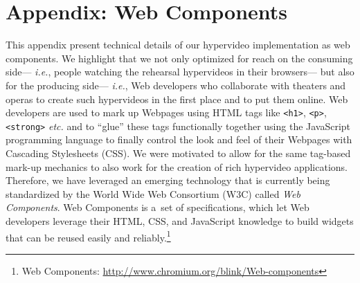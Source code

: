 \newpage

\section*{Appendix: Web Components}
This appendix present technical details of our hypervideo implementation as web components.
We highlight that we not only optimized for reach on the consuming side---%
\emph{i.e.}, people watching the rehearsal hypervideos in their browsers---%
but also for the producing side---%
\emph{i.e.}, Web developers who collaborate with theaters and operas
to create such hypervideos in the first place and to put them online.
Web developers are used to mark up Webpages using HTML tags
like \texttt{<h1>}, \texttt{<p>}, \texttt{<strong>} \emph{etc.}
and to ``glue'' these tags functionally together using the JavaScript programming language
to finally control the look and feel of their Webpages with Cascading Stylesheets (CSS).
We were motivated to allow for the same tag-based mark-up mechanics
to also work for the creation of rich hypervideo applications.
Therefore, we have leveraged an emerging technology
that is currently being standardized by the World Wide Web Consortium (W3C)
called \emph{Web Components}.
Web Components is a~set of specifications, which let Web developers leverage
their HTML, CSS, and JavaScript knowledge to build widgets
that can be reused easily and reliably.\footnote{Web Components:
\url{http://www.chromium.org/blink/Web-components}}

%

